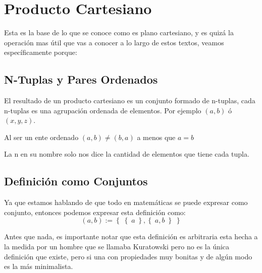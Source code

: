 \documentclass[12pt, fleqn]{report}                             %
\theoremstyle{break}                                            %
\newcommand{\Set}[1]            {\left\{ \; #1 \; \right\}}     %
\begin{document}
        \clearpage
        \section{Producto Cartesiano}

            Esta es la base de lo que se conoce como es plano cartesiano, y es quizá
            la operación mas útil que vas a conocer a lo largo de estos textos,
            veamos específicamente porque:


            \subsection{N-Tuplas y Pares Ordenados}

                El resultado de un producto cartesiano es un conjunto formado de n-tuplas,
                cada n-tuplas es una agrupación ordenada de elementos.
                Por ejemplo $(a,b)$ ó $(x,y,z)$.


                Al ser un ente ordenado $(a,b) \neq (b,a)$ a menos que $a=b$

                La n en su nombre solo nos dice la cantidad de elementos que tiene cada tupla.



                \subsection*{Definición como Conjuntos}

                    Ya que estamos hablando de que todo en matemáticas se puede expresar como
                    conjunto, entonces podemos expresar esta definición como:
                    \begin{equation*}
                        (a, b) := \Set{ \Set{a}, \Set{a, b} }
                    \end{equation*}

                    Antes que nada, es importante notar que esta definición es arbitraria
                    esta hecha a la medida por un hombre que se llamaba Kuratowski pero
                    no es la única definición que existe, pero si una con propiedades muy
                    bonitas y de algún modo es la más minimalista.
\end{document}
